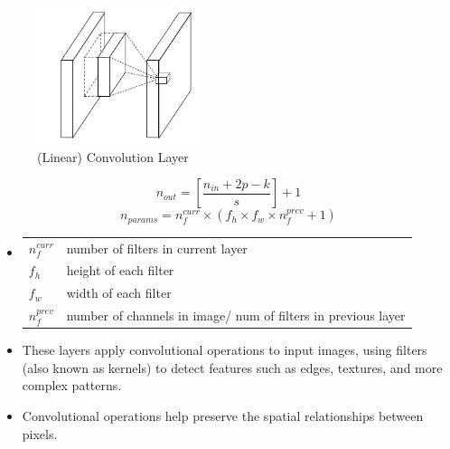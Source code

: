 \begin{table}[h]
    \begin{minipage}{0.44\linewidth}
        \begin{figure}[H]
            \centering
            \includegraphics[width=\linewidth, height=4cm, keepaspectratio]{Pictures/layers/conv-layer-linear.jpg}
            \caption{(Linear) Convolution Layer \cite{medium/towardsdatascience.com/review-nin-network-in-network-image-classification-69e271e499ee}}
        \end{figure}
    \end{minipage}
    \hfill
    \begin{minipage}{0.54\linewidth}
        \[
           \displaystyle n_{out} = \left[ \dfrac{n_{in} + 2p - k}{s} \right] + 1
        \]
        \[
            n_{params} = n_f^{curr} \times ( f_h \times f_w \times  n_f^{prev} + 1)
        \]
        
        \begin{itemize}
            \item[] 
            \begin{table}[H]
                \begin{tabular}{l p{5.5cm}}
                    $n_f^{curr}$ & number of filters in current layer \\
                
                    $f_h$ & height of each filter \\
                    
                    $f_w$ & width of each filter\\
                    
                    $n_f^{prev}$ & number of channels in image/ num of filters in previous layer
                \end{tabular}
            \end{table}
            
            \item These layers apply convolutional operations to input images, using filters (also known as kernels) to detect features such as edges, textures, and more complex patterns. 
            
            \item Convolutional operations help preserve the spatial relationships between pixels.
        \end{itemize}
    \end{minipage}
\end{table}


